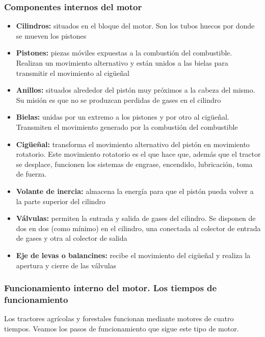 \documentclass[a4paper,12pt,oneside]{article}
\begin{document}
\subsubsection{Componentes internos del motor}
\label{sec:orgf062396}

\begin{itemize}
\item \textbf{Cilindros:} situados en el bloque del motor. Son los tubos huecos por donde
se mueven los pistones
\item \textbf{Pistones:} piezas móviles expuestas a la combustión del combustible. Realizan
un movimiento alternativo y están unidos a  las bielas para transmitir el
movimiento al cigüeñal
\item \textbf{Anillos:} situados alrededor del pistón muy próximos a la cabeza del
mismo. Su misión es que no se produzcan perdidas de gases en el cilindro
\item \textbf{Bielas:} unidas por un extremo a los pistones y por otro al
cigüeñal. Transmiten el movimiento generado por la combustión del combustible
\item \textbf{Cigüeñal:} transforma el movimiento alternativo del pistón en movimiento
rotatorio. Este movimiento rotatorio es el que hace que, además que el
tractor se desplace, funcionen los sistemas de engrase, encendido,
lubricación, toma de fuerza.
\item \textbf{Volante de inercia:} almacena la energía para que el pistón pueda volver a la
parte superior del cilindro
\item \textbf{Válvulas:} permiten la entrada y salida de gases del cilindro. Se disponen de
dos en dos (como mínimo) en el cilindro, una conectada al colector de entrada
de gases y otra al colector de salida
\item \textbf{Eje de levas o balancines:} recibe el movimiento del cigüeñal y realiza la
apertura y cierre de las válvulas
\end{itemize}
\subsubsection{Funcionamiento interno del motor. Los tiempos de funcionamiento}
\label{sec:org9e72b24}
Los tractores agrícolas y forestales funcionan mediante motores de cuatro
tiempos. Veamos los pasos de funcionamiento que sigue este tipo de motor.
\end{document}
